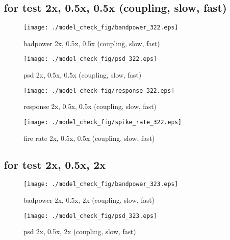 \documentclass[11pt]{article}
\begin{document}
\subsection{for test 2x, 0.5x, 0.5x (coupling, slow, fast)}
\label{sec:org322}

\begin{figure}[htbp]
\centering
\texttt{[image: ./model\_check\_fig/bandpower\_322.eps]}
\caption{badpower 2x, 0.5x, 0.5x (coupling, slow, fast)}
\end{figure}

\begin{figure}[htbp]
\begin{center}
\texttt{[image: ./model\_check\_fig/psd\_322.eps]}
\caption{psd 2x, 0.5x, 0.5x (coupling, slow, fast)}
\end{center}
\end{figure}

\begin{figure}[htbp]
\begin{center}
\texttt{[image: ./model\_check\_fig/response\_322.eps]}
\caption{response 2x, 0.5x, 0.5x (coupling, slow, fast)}
\end{center}
\end{figure}

\begin{figure}[htbp]
\begin{center}
\texttt{[image: ./model\_check\_fig/spike\_rate\_322.eps]}
\caption{fire rate 2x, 0.5x, 0.5x (coupling, slow, fast)}
\end{center}
\end{figure}


\subsection{for test 2x, 0.5x, 2x}
\label{sec:org323}

\begin{figure}[htbp]
\centering
\texttt{[image: ./model\_check\_fig/bandpower\_323.eps]}
\caption{badpower 2x, 0.5x, 2x (coupling, slow, fast)}
\end{figure}

\begin{figure}[htbp]
\begin{center}
\texttt{[image: ./model\_check\_fig/psd\_323.eps]}
\caption{psd 2x, 0.5x, 2x (coupling, slow, fast)}
\end{center}
\end{figure}
\end{document}
